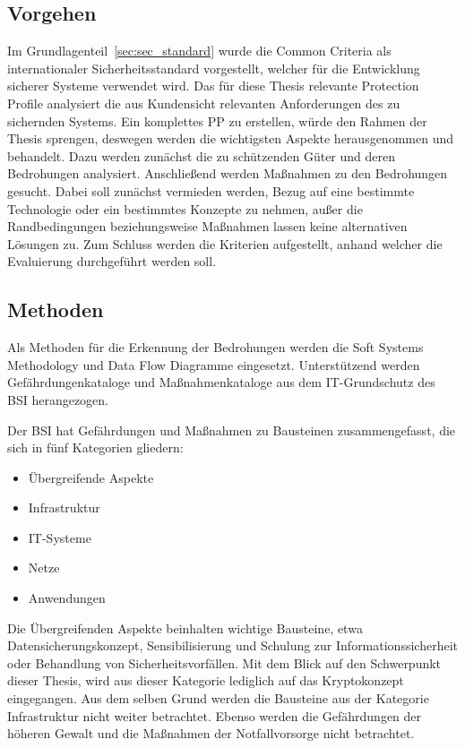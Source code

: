 \documentclass[11pt,a4paper]{report}
\begin{document}
\subsection{Vorgehen}

Im Grundlagenteil~\ref{sec:sec_standard} wurde die Common Criteria als internationaler Sicherheitsstandard vorgestellt, welcher für die Entwicklung sicherer Systeme verwendet wird. Das für diese Thesis relevante Protection Profile analysiert die aus Kundensicht relevanten Anforderungen des zu sichernden Systems. Ein komplettes PP zu erstellen, würde den Rahmen der Thesis sprengen, deswegen werden die wichtigsten Aspekte herausgenommen und behandelt. Dazu werden zunächst die zu schützenden Güter und deren Bedrohungen analysiert. Anschließend werden Maßnahmen zu den Bedrohungen gesucht. Dabei soll zunächst vermieden werden, Bezug auf eine bestimmte Technologie oder ein bestimmtes Konzepte zu nehmen, außer die Randbedingungen beziehungsweise Maßnahmen lassen keine alternativen Lösungen zu. Zum Schluss werden die Kriterien aufgestellt, anhand welcher die Evaluierung durchgeführt werden soll.

\subsection{Methoden}

Als Methoden für die Erkennung der Bedrohungen werden die Soft Systems Methodology und Data Flow Diagramme eingesetzt. Unterstützend werden Gefährdungenkataloge und Maßnahmenkataloge aus dem IT-Grundschutz des BSI herangezogen. 

Der BSI hat Gefährdungen und Maßnahmen zu Bausteinen zusammengefasst, die sich in fünf Kategorien gliedern:

\begin{itemize}
\item Übergreifende Aspekte
\item Infrastruktur 
\item IT-Systeme
\item Netze 
\item Anwendungen
\end{itemize} 

Die Übergreifenden Aspekte beinhalten wichtige Bausteine, etwa Datensicherungskonzept, Sensibilisierung und Schulung zur Informationssicherheit oder Behandlung von Sicherheitsvorfällen. Mit dem Blick auf den Schwerpunkt dieser Thesis, wird aus dieser Kategorie lediglich auf das Kryptokonzept eingegangen. Aus dem selben Grund werden die Bausteine aus der Kategorie Infrastruktur nicht weiter betrachtet. Ebenso werden die Gefährdungen der höheren Gewalt und die Maßnahmen der Notfallvorsorge nicht betrachtet.
\end{document}
